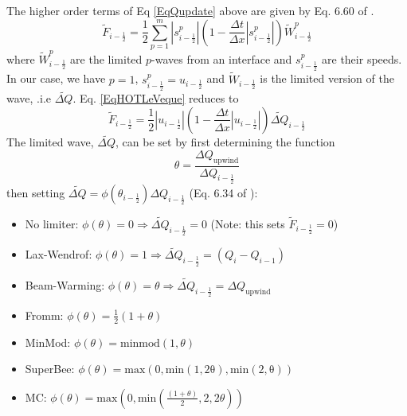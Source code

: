 The higher order terms of Eq \ref{EqQupdate} above are given by Eq. 6.60 of \cite{LeVeque2003}.
\begin{equation}\label{EqHOTLeVeque}
\widetilde{F}_{i-\frac{1}{2}} = \frac{1}{2}\sum_{p=1}^{m} \left| s^p_{i-\frac{1}{2}}  \right|
\left( 1 - \frac{\Delta t}{\Delta x} \left| s^p_{i-\frac{1}{2}}  \right|  \right)
\widetilde{W}^p_{i-\frac{1}{2}}
\end{equation}
where $\widetilde{W}^p_{i-\frac{1}{2}}$ are the limited $p$-waves from an interface
and $s^p_{i-\frac{1}{2}}$ are their speeds.  In our case, we have $p=1$, 
$s^p_{i-\frac{1}{2}}=u_{i-\frac{1}{2}}$ and $\widetilde{W}_{i-\frac{1}{2}}$ is the limited version of
the wave, .i.e $\widetilde{\Delta Q}$.
Eq. \ref{EqHOTLeVeque} reduces to
\begin{equation}\label{EqHOTAsh3d}
\widetilde{F}_{i-\frac{1}{2}} = \frac{1}{2} \left| u_{i-\frac{1}{2}}  \right|
\left( 1 - \frac{\Delta t}{\Delta x} \left| u_{i-\frac{1}{2}}  \right|  \right)
\widetilde{\Delta Q}_{i-\frac{1}{2}}
\end{equation}
The limited wave, $\widetilde{\Delta Q}$, can be set by first determining the
function
\begin{equation}
\theta = \frac{\Delta Q_{\mathrm{upwind}}}{\Delta Q_{i-\frac{1}{2}}}
\end{equation}
then setting
$\widetilde{\Delta Q} = \phi\left( \theta_{i-\frac{1}{2}} \right) \Delta Q_{i-\frac{1}{2}}$
(Eq. 6.34 of \cite{LeVeque2003}):
\begin{itemize}
 \item No limiter: $\phi\left( \theta \right) = 0  \Rightarrow \widetilde{\Delta Q}_{i-\frac{1}{2}} = 0$
       (Note: this sets $\widetilde{F}_{i-\frac{1}{2}} = 0$)
 \item Lax-Wendrof: $\phi\left( \theta \right) = 1 \Rightarrow \widetilde{\Delta Q}_{i-\frac{1}{2}} = ( Q_i - Q_{i-1})$
 \item Beam-Warming:  $\phi\left( \theta \right) = \theta \Rightarrow \widetilde{\Delta Q}_{i-\frac{1}{2}} = \Delta Q_{\mathrm{upwind}}$
 \item Fromm: $\phi\left( \theta \right) = \frac{1}{2}\left( 1 + \theta\right) $
 \item MinMod: $\phi\left( \theta \right) = \mathrm{minmod}\left( 1,\theta \right)$
 \item SuperBee: $\phi\left( \theta \right) = \mathrm{max}\left(0, \mathrm{min \left( 1,2\theta\right),\mathrm{min}\left(2,\theta \right)} \right )$
 \item MC: $\phi\left( \theta \right) = \mathrm{max}\left(0,  \mathrm{min} \left( \frac{\left( 1+\theta \right)}{2} ,2,2\theta \right) \right) $
\end{itemize}

